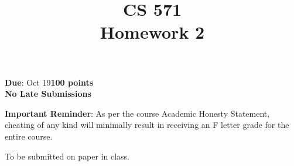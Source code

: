 \documentclass[12pt]{article}
\title{CS 571\\Homework 2}
\date{}
\begin{document}
\maketitle

\begin{flushleft}
\textbf{Due}: Oct 19\hfill\textbf{100 points}\\

\textbf{No Late Submissions}

\vspace{0.5cm}

\textbf{Important Reminder}: As per the course Academic Honesty
Statement, cheating of any kind will minimally result in receiving an
F letter grade for the entire course.

\vspace{0.5cm}
To be submitted on paper in class.

\end{flushleft}
\end{document}
